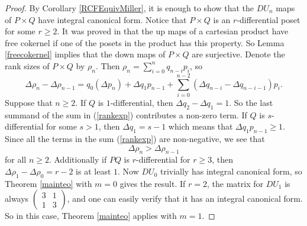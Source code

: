 \documentclass[ALCO, Unicode]{cedram}
\begin{document}
\begin{proof}     By Corollary \ref{RCFEquivMiller}, it is enough to show that the $ DU_{n} $ maps of $ P \times Q $ have integral canonical form.                                                                             Notice that $ P \times Q $ is an $ r$-differential poset for some $ r \geq 2 $. It was proved in \cite[Proposition 4.5]{Miller} that the up maps of a cartesian product have free cokernel if one of the posets in the product has this property. So Lemma \ref{freecokernel}  implies that  the down maps of $ P \times Q $  are surjective. Denote the rank sizes of  $ P \times Q $ by $ \rho_{n} $. Then 
$     \rho _{n}  =                         \sum_{  i = 0 } ^{  n}      q_{n-i}                   p _{ i }               $, so 
\begin{equation} \label{rankexp}  \Delta \rho _{n} - \Delta \rho _{n-1}   =  q_{0}(    \Delta p_{n}     ) +   \Delta  q_{1}  p_{n-1}  +     \sum_{i=0}^{n-2}         ( \Delta  q_{n-i}  - \Delta q_{n-i -1 }  )    p_{i}                           .                             
\end{equation} 
Suppose that  $ n \geq 2 $. If $ Q $ is $ 1  $-differential, then $ \Delta q_{2} - \Delta q_{1} = 1$. So the last summand of the sum in (\ref{rankexp})                           contributes a non-zero term. If $ Q $ is $  s $-differential for some $ s  > 1 $, then %
$ \Delta q_{1} =  s - 1 $ which means that $ \Delta q_{1} p_{n-1} \geq 1  $.  Since all the terms in the sum (\ref{rankexp})   are non-negative,       we see that  $$ \Delta \rho _{n}   > \Delta \rho _{n-1}   $$ for all $ n \geq 2 $. 
Additionally if  $ PQ $ is $ r $-differential for $ r \geq 3 $, then $ \Delta \rho_{1} - \Delta \rho_{0}  = r - 2 $ is at least $ 1 $.  Now  $ DU_{0} $ trivially has integral canonical form, so Theorem \ref{mainteo} with $ m = 0 $  gives the result.  
If $ r = 2 $, the matrix for $ DU_{1} $ is always $ \left ( \begin{smallmatrix} 3 & 1 \\ 1 & 3     \end{smallmatrix} \right )    $, and one can easily verify that it has an integral canonical form. So in this case, 
Theorem \ref{mainteo} applies with $ m = 1 $.     
\end{proof}                    
   
\end{document}
